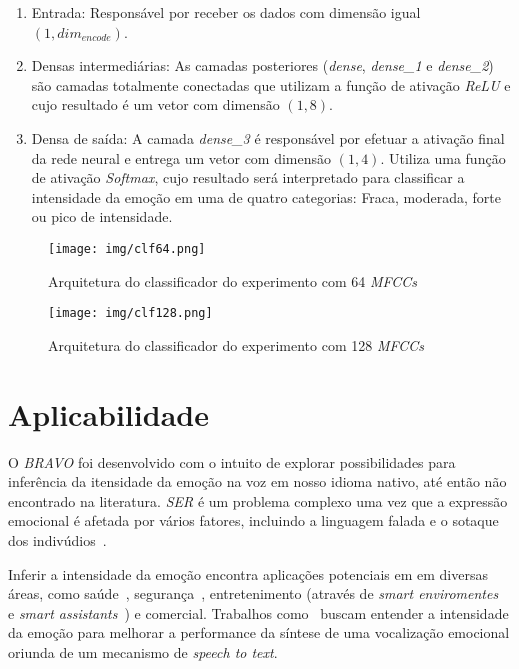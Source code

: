 \begin{enumerate}
    \item Entrada: Responsável por receber os dados com dimensão igual $(1, dim_{encode})$.
    \item Densas intermediárias: As camadas posteriores (\textit{dense}, \textit{dense\_1} e \textit{dense\_2}) são camadas totalmente conectadas que utilizam a função de ativação \textit{ReLU} e cujo resultado é um vetor com dimensão $(1, 8)$.
    \item Densa de saída: A camada \textit{dense\_3} é responsável por efetuar a ativação final da rede neural e entrega um vetor com dimensão $(1, 4)$. Utiliza uma função de ativação \textit{Softmax}, cujo resultado será interpretado para classificar a intensidade da emoção em uma de quatro categorias: Fraca, moderada, forte ou pico de intensidade.
\end{enumerate}

\begin{figure}[h]
    \centering
    \begin{minipage}[b]{0.45\linewidth}
        \centering
        \texttt{[image: img/clf64.png]}
        \caption{\label{fig:clf64}Arquitetura do classificador do experimento com 64 \textit{MFCCs}}
    \end{minipage}
    \begin{minipage}[b]{0.45\linewidth}
    \centering
        \texttt{[image: img/clf128.png]}
        \caption{\label{fig:clf128}Arquitetura do classificador do experimento com 128 \textit{MFCCs}}
    \end{minipage}
\end{figure}

\section{Aplicabilidade}\label{sec:aplicabilidade}

O \textit{BRAVO} foi desenvolvido com o intuito de explorar possibilidades para inferência da itensidade da emoção na voz em nosso idioma nativo, até então não encontrado na literatura. \textit{SER} é um problema complexo uma vez que a expressão emocional é afetada por vários fatores, incluindo a linguagem falada e o sotaque dos indivúdios~\cite{6}.

Inferir a intensidade da emoção encontra aplicações potenciais em em diversas áreas, como saúde~\cite{1}, segurança~\cite{4}, entretenimento (através de \textit{smart enviromentes}~\cite{alexa1} e \textit{smart assistants}~\cite{alexa2}) e comercial\cite{bsignal1}\cite{bsignal2}. Trabalhos como~\cite{63} buscam entender a intensidade da emoção para melhorar a performance da síntese de uma vocalização emocional oriunda de um mecanismo de \textit{speech to text}.

